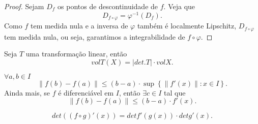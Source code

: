 \begin{proof}
    Sejam $D_f$ os pontos de descontinuidade de $f$. Veja que \[
    D_{f\circ \varphi} = \varphi^{-1}\left( D_f \right) 
    .\] Como $f$ tem medida nula e a inversa de $\varphi$ também é localmente Lipschitz, $D_{f\circ \varphi}$ tem medida nula, ou seja, garantimos a integrabilidade de $f\circ \varphi$.
\end{proof}

\begin{note}
    Seja $T$ uma transformação linear, então \[
    vol T\left( X \right) = \left| det. T \right| \cdot vol X
    .\] 
\end{note}

\begin{note}
    $\forall a,b \in I$\[
    \|f\left( b \right) - f\left( a \right)  \| \le \left( b-a \right) \cdot \sup \left\{ \|f'\left( x \right) \| : x\in I \right\} 
    .\] Ainda mais, se $f$ é diferenciável em $I$, então $\exists c\in I$ tal que \[
    \|f\left( b \right) - f\left( a \right)  \| \le \left( b-a \right) \cdot f'\left( x \right) 
    .\] 
\end{note}

\begin{note}
    \[
    det\left( \left( f\circ g \right) '\left( x \right)  \right) = det f'\left( g\left( x \right)  \right) \cdot det g'\left( x \right) 
    .\] 
\end{note}

